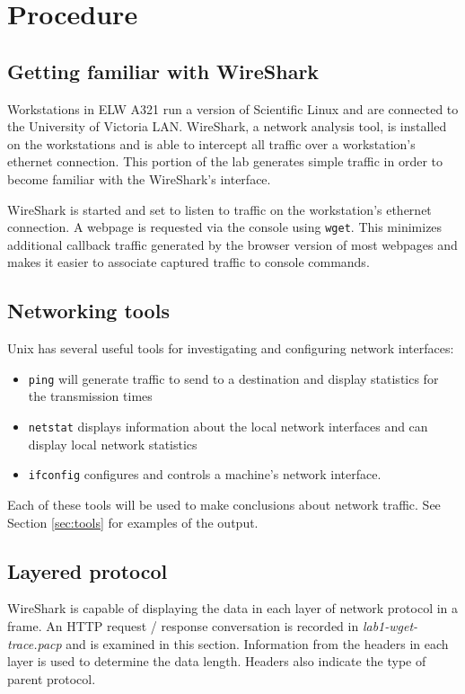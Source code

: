 \section{Procedure}\label{sec:procedure}
\subsection{Getting familiar with WireShark}
Workstations in ELW A321 run a version of Scientific Linux and are connected to the University of Victoria LAN.
WireShark, a network analysis tool, is installed on the workstations and is able to intercept all traffic over a workstation's ethernet connection.
This portion of the lab generates simple traffic in order to become familiar with the WireShark's interface.

WireShark is started and set to listen to traffic on the workstation's ethernet connection.
A webpage is requested via the console using \texttt{wget}.
This minimizes additional callback traffic generated by the browser version of most webpages and makes it easier to associate captured traffic to console commands.

\subsection{Networking tools}
Unix has several useful tools for investigating and configuring network interfaces:
\begin{itemize}
	\item \texttt{ping} will generate traffic to send to a destination and display statistics for the transmission times
	\item \texttt{netstat} displays information about the local network interfaces and can display local network statistics
	\item \texttt{ifconfig} configures and controls a machine's network interface.
\end{itemize}

Each of these tools will be used to make conclusions about network traffic.
See Section \ref{sec:tools} for examples of the output.

\subsection{Layered protocol}
WireShark is capable of displaying the data in each layer of network protocol in a frame.
An HTTP request / response conversation is recorded in \textit{lab1-wget-trace.pacp} and is examined in this section.
Information from the headers in each layer is used to determine the data length.
Headers also indicate the type of parent protocol.
